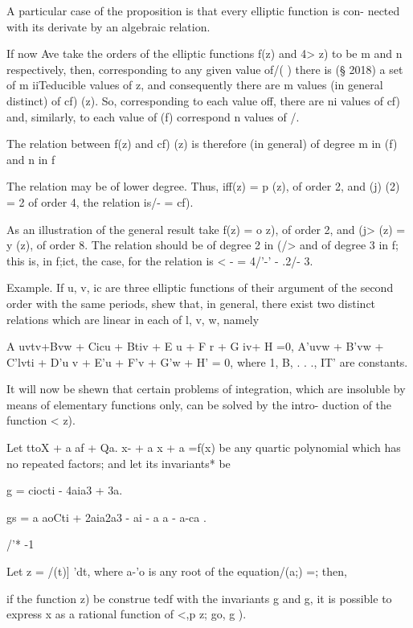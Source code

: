 {A particular case of the proposition is that every elliptic function
is con- nected with its derivate by an algebraic relation.

If now Ave take the orders of the elliptic functions f(z) and 4> z) to
be m and n respectively, then, corresponding to any given value of/( )
there is (§ 2018) a set of m iiTeducible values of z, and consequently
there are m values (in general distinct) of cf) (z). So, corresponding
to each value off, there are ni values of cf) and, similarly, to each
value of (f) correspond n values of /.

The relation between f(z) and cf) (z) is therefore (in general) of
degree m in (f) and n in f

The relation may be of lower degree. Thus, iff(z) = p (z), of order 2,
and (j) (2) = 2 of order 4, the relation is/- = cf).

As an illustration of the general result take f(z) = o z), of order 2,
and (j> (z) = y (z), of order 8. The relation should be of degree 2 in
(/> and of degree 3 in f; this is, in f;ict, the case, for the
relation is < - = 4/'-' - .2/- 3.

Example. If u, v, ic are three elliptic functions of their argument of
the second order with the same periods, shew that, in general, there
exist two distinct relations which are linear in each of l, v, w,
namely

A uvtv+Bvw + Cicu + Btiv + E u + F r + G iv+ H =0, A'uvw + B'vw +
C'lvti + D'u v + E'u + F'v + G'w + H' = 0, where 1, B, . . ., IT'
are constants.


It will now be shewn that certain problems of integration, which are
insoluble by means of elementary functions only, can be solved by the
intro- duction of the function < z).

%
%

Let ttoX + a af + Qa. x- + a x + a =f(x) be any quartic polynomial
which has no repeated factors; and let its invariants* be

g = ciocti - 4aia3 + 3a.

gs = a aoCti + 2aia2a3 - ai - a a - a-ca .

/'* -1

Let z = /(t)] 'dt, where a-'o is any root of the equation/(a;) =;
then,

if the function z) be construe tedf with the invariants g and g, it
is possible to express x as a rational function of <,p z; go, g ).

}
